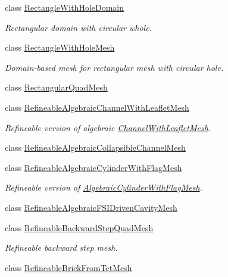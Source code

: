 \begin{DoxyCompactItemize}
class \hyperlink{classoomph_1_1RectangleWithHoleDomain}{Rectangle\+With\+Hole\+Domain}
\begin{DoxyCompactList}\small\item\em Rectangular domain with circular whole. \end{DoxyCompactList}\item 
class \hyperlink{classoomph_1_1RectangleWithHoleMesh}{Rectangle\+With\+Hole\+Mesh}
\begin{DoxyCompactList}\small\item\em Domain-\/based mesh for rectangular mesh with circular hole. \end{DoxyCompactList}\item 
class \hyperlink{classoomph_1_1RectangularQuadMesh}{Rectangular\+Quad\+Mesh}
\item 
class \hyperlink{classoomph_1_1RefineableAlgebraicChannelWithLeafletMesh}{Refineable\+Algebraic\+Channel\+With\+Leaflet\+Mesh}
\begin{DoxyCompactList}\small\item\em Refineable version of algebraic \hyperlink{classoomph_1_1ChannelWithLeafletMesh}{Channel\+With\+Leaflet\+Mesh}. \end{DoxyCompactList}\item 
class \hyperlink{classoomph_1_1RefineableAlgebraicCollapsibleChannelMesh}{Refineable\+Algebraic\+Collapsible\+Channel\+Mesh}
\item 
class \hyperlink{classoomph_1_1RefineableAlgebraicCylinderWithFlagMesh}{Refineable\+Algebraic\+Cylinder\+With\+Flag\+Mesh}
\begin{DoxyCompactList}\small\item\em Refineable version of \hyperlink{classoomph_1_1AlgebraicCylinderWithFlagMesh}{Algebraic\+Cylinder\+With\+Flag\+Mesh}. \end{DoxyCompactList}\item 
class \hyperlink{classoomph_1_1RefineableAlgebraicFSIDrivenCavityMesh}{Refineable\+Algebraic\+F\+S\+I\+Driven\+Cavity\+Mesh}
\item 
class \hyperlink{classoomph_1_1RefineableBackwardStepQuadMesh}{Refineable\+Backward\+Step\+Quad\+Mesh}
\begin{DoxyCompactList}\small\item\em Refineable backward step mesh. \end{DoxyCompactList}\item 
class \hyperlink{classoomph_1_1RefineableBrickFromTetMesh}{Refineable\+Brick\+From\+Tet\+Mesh}
\item 

\end{DoxyCompactItemize}
